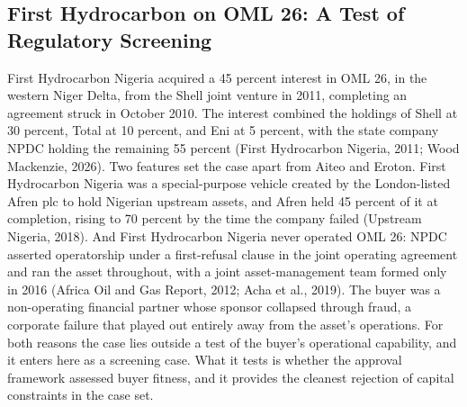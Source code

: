 \hypertarget{first-hydrocarbon-on-oml-26-a-test-of-regulatory-screening}{%
\subsection{First Hydrocarbon on OML 26: A Test of Regulatory
Screening}\label{first-hydrocarbon-on-oml-26-a-test-of-regulatory-screening}}

First Hydrocarbon Nigeria acquired a 45 percent interest in OML 26, in
the western Niger Delta, from the Shell joint venture in 2011,
completing an agreement struck in October 2010. The interest combined
the holdings of Shell at 30 percent, Total at 10 percent, and Eni at 5
percent, with the state company NPDC holding the remaining 55 percent
(First Hydrocarbon Nigeria, 2011; Wood Mackenzie, 2026). Two features
set the case apart from Aiteo and Eroton. First Hydrocarbon Nigeria was
a special-purpose vehicle created by the London-listed Afren plc to hold
Nigerian upstream assets, and Afren held 45 percent of it at completion,
rising to 70 percent by the time the company failed (Upstream Nigeria,
2018). And First Hydrocarbon Nigeria never operated OML 26: NPDC
asserted operatorship under a first-refusal clause in the joint
operating agreement and ran the asset throughout, with a joint
asset-management team formed only in 2016 (Africa Oil and Gas Report,
2012; Acha et al., 2019). The buyer was a non-operating financial
partner whose sponsor collapsed through fraud, a corporate failure that
played out entirely away from the asset's operations. For both reasons
the case lies outside a test of the buyer's operational capability, and
it enters here as a screening case. What it tests is whether the
approval framework assessed buyer fitness, and it provides the cleanest
rejection of capital constraints in the case set.

